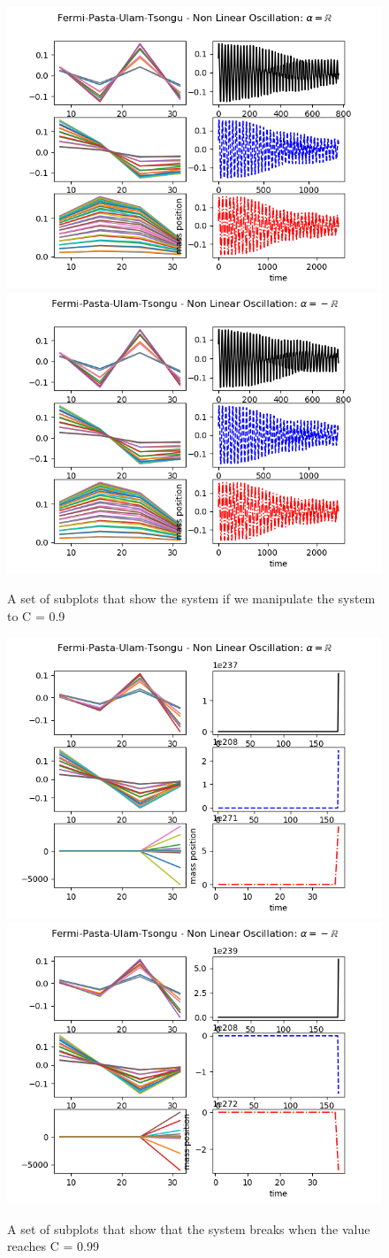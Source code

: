 \begin{figure}[h]
\includegraphics[width=.5\textwidth]{figures/FPUT2.1.png}
\includegraphics[width=.5\textwidth]{figures/FPUT3.1.png}
\caption{A set of subplots that show the system if we manipulate the system to C = 0.9}
\end{figure}

\begin{figure}[h]
\includegraphics[width=.5\textwidth]{figures/FPUT2.2.png}
\includegraphics[width=.5\textwidth]{figures/FPUT3.2.png}    
\caption{A set of subplots that show that the system breaks when the value reaches C = 0.99}
\end{figure}

